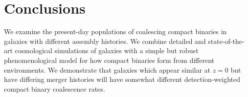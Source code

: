 \documentclass[a4paper,fleqn,usenatbib]{mnras}
\newcommand\editremark[1]{{\color{red}#1}}
\newcommand\jillianremark[1]{{\color{blue}#1}}
\begin{document}






\section{Conclusions}
\label{sec:conclude}

We examine the present-day populations of coalescing compact binaries in galaxies with different assembly histories.  We
combine  detailed and state-of-the-art cosmological simulations of galaxies with a simple but robust phenomenological
model for how compact binaries form from different environments.   
 We demonstrate that
galaxies which appear similar at $z = 0$ but have differing merger histories will have somewhat different
detection-weighted compact binary
coalescence rates.   
\end{document}
